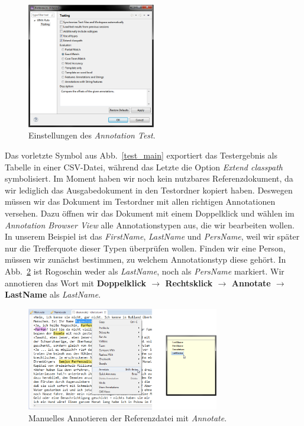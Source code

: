\documentclass{article}
\begin{document}
\begin{figure}
\centering
\includegraphics[width=0.5\textwidth]{figs/test_pref.png}
\caption{Einstellungen des \textit{Annotation Test}.}
\label{test_pref}
\end{figure}

Das vorletzte Symbol aus Abb.~\ref{test_main} exportiert das Testergebnis als Tabelle in einer CSV-Datei, während das Letzte die Option \textit{Extend classpath} symbolisiert. Im Moment haben wir noch kein nutzbares Referenzdokument, da wir lediglich das Ausgabedokument in den Testordner kopiert haben. Deswegen müssen wir das Dokument im Testordner mit allen richtigen Annotationen versehen. Dazu öffnen wir das Dokument mit einem Doppelklick und wählen im \textit{Annotation Browser View} alle Annotationstypen aus, die wir bearbeiten wollen. In unserem Beispiel ist das \textit{FirstName}, \textit{LastName} und \textit{PersName}, weil wir später nur die Trefferquote dieser Typen überprüfen wollen. Finden wir eine Person, müssen wir zunächst bestimmen, zu welchem Annotationstyp diese gehört. In Abb.~\ref{annotate} ist \glqq Rogoschin\grqq{} weder als \textit{LastName}, noch als \textit{PersName} markiert. Wir annotieren das Wort mit \textbf{Doppelklick $\rightarrow$ Rechtsklick $\rightarrow$ Annotate $\rightarrow$ LastName} als \textit{LastName}.

\begin{figure}
\centering
\includegraphics[width=0.75\textwidth]{figs/test_annotate.png}
\caption{Manuelles Annotieren der Referenzdatei mit \textit{Annotate}.}
\label{annotate}
\end{figure}
\end{document}
